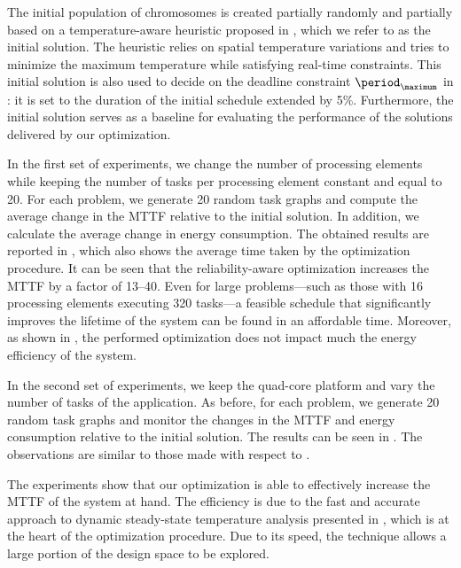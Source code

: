 The initial population of chromosomes is created partially randomly and
partially based on a temperature-aware heuristic proposed in \cite{xie2006},
which we refer to as the initial solution. The heuristic relies on spatial
temperature variations and tries to minimize the maximum temperature while
satisfying real-time constraints. This initial solution is also used to decide
on the deadline constraint $\period_\maximum$ in
: it is set to the duration of the initial
schedule extended by 5\%. Furthermore, the initial solution serves as a baseline
for evaluating the performance of the solutions delivered by our optimization.

In the first set of experiments, we change the number of processing elements \np
while keeping the number of tasks \nt per processing element constant and equal
to 20. For each problem, we generate 20 random task graphs and compute the
average change in the \ac{MTTF} relative to the initial solution. In addition,
we calculate the average change in energy consumption. The obtained results are
reported in , which also shows the average
time taken by the optimization procedure. It can be seen that the
reliability-aware optimization increases the \ac{MTTF} by a factor of 13--40.
Even for large problems---such as those with 16 processing elements executing
320 tasks---a feasible schedule that significantly improves the lifetime of the
system can be found in an affordable time. Moreover, as shown in
, the performed optimization does not impact
much the energy efficiency of the system.

In the second set of experiments, we keep the quad-core platform and vary the
number of tasks \nt of the application. As before, for each problem, we generate
20 random task graphs and monitor the changes in the \ac{MTTF} and energy
consumption relative to the initial solution. The results can be seen in
. The observations are similar to those made with
respect to .

The experiments show that our optimization is able to effectively increase the
\ac{MTTF} of the system at hand. The efficiency is due to the fast and accurate
approach to dynamic steady-state temperature analysis presented in
, which is at the heart of the optimization
procedure. Due to its speed, the technique allows a large portion of the design
space to be explored.

